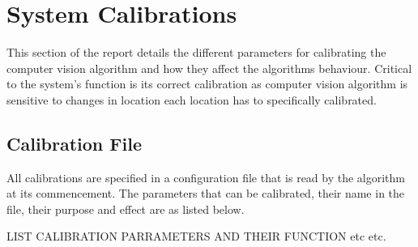 \chapter{System Calibrations}

This section of the report details the different parameters for calibrating the computer vision algorithm and how they affect the algorithms behaviour. Critical to the system's function is its correct calibration as computer vision algorithm is sensitive to changes in location each location has to specifically calibrated.

\section{Calibration File}

All calibrations are specified in a configuration file that is read by the algorithm at its commencement. The parameters that can be calibrated, their name in the file, their purpose and effect are as listed below.


LIST CALIBRATION PARRAMETERS AND THEIR FUNCTION etc etc.